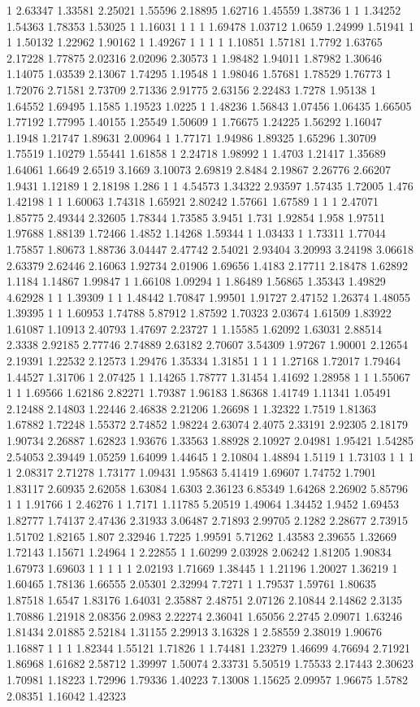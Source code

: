 1 2.63347 1.33581 2.25021 1.55596 2.18895 1.62716 1.45559 1.38736 1 1 1.34252 1.54363 1.78353 1.53025 1 1.16031 1 1 1 1.69478 1.03712 1.0659 1.24999 1.51941 1 1 1.50132 1.22962 1.90162 1 1.49267 1 1 1 1 1.10851 1.57181 1.7792 1.63765 2.17228 1.77875 2.02316 2.02096 2.30573 1 1.98482 1.94011 1.87982 1.30646 1.14075 1.03539 2.13067 1.74295 1.19548 1 1.98046 1.57681 1.78529 1.76773 1 1.72076 2.71581 2.73709 2.71336 2.91775 2.63156 2.22483 1.7278 1.95138 1 1.64552 1.69495 1.1585 1.19523 1.0225 1 1.48236 1.56843 1.07456 1.06435 1.66505 1.77192 1.77995 1.40155 1.25549 1.50609 1 1.76675 1.24225 1.56292 1.16047 1.1948 1.21747 1.89631 2.00964 1 1.77171 1.94986 1.89325 1.65296 1.30709 1.75519 1.10279 1.55441 1.61858 1 2.24718 1.98992 1 1.4703 1.21417 1.35689 1.64061 1.6649 2.6519 3.1669 3.10073 2.69819 2.8484 2.19867 2.26776 2.66207 1.9431 1.12189 1 2.18198 1.286 1 1 4.54573 1.34322 2.93597 1.57435 1.72005 1.476 1.42198 1 1 1.60063 1.74318 1.65921 2.80242 1.57661 1.67589 1 1 1 2.47071 1.85775 2.49344 2.32605 1.78344 1.73585 3.9451 1.731 1.92854 1.958 1.97511 1.97688 1.88139 1.72466 1.4852 1.14268 1.59344 1 1.03433 1 1.73311 1.77044 1.75857 1.80673 1.88736 3.04447 2.47742 2.54021 2.93404 3.20993 3.24198 3.06618 2.63379 2.62446 2.16063 1.92734 2.01906 1.69656 1.4183 2.17711 2.18478 1.62892 1.1184 1.14867 1.99847 1 1.66108 1.09294 1 1.86489 1.56865 1.35343 1.49829 4.62928 1 1 1.39309 1 1 1.48442 1.70847 1.99501 1.91727 2.47152 1.26374 1.48055 1.39395 1 1 1.60953 1.74788 5.87912 1.87592 1.70323 2.03674 1.61509 1.83922 1.61087 1.10913 2.40793 1.47697 2.23727 1 1.15585 1.62092 1.63031 2.88514 2.3338 2.92185 2.77746 2.74889 2.63182 2.70607 3.54309 1.97267 1.90001 2.12654 2.19391 1.22532 2.12573 1.29476 1.35334 1.31851 1 1 1 1.27168 1.72017 1.79464 1.44527 1.31706 1 2.07425 1 1.14265 1.78777 1.31454 1.41692 1.28958 1 1 1.55067 1 1 1.69566 1.62186 2.82271 1.79387 1.96183 1.86368 1.41749 1.11341 1.05491 2.12488 2.14803 1.22446 2.46838 2.21206 1.26698 1 1.32322 1.7519 1.81363 1.67882 1.72248 1.55372 2.74852 1.98224 2.63074 2.4075 2.33191 2.92305 2.18179 1.90734 2.26887 1.62823 1.93676 1.33563 1.88928 2.10927 2.04981 1.95421 1.54285 2.54053 2.39449 1.05259 1.64099 1.44645 1 2.10804 1.48894 1.5119 1 1.73103 1 1 1 1 2.08317 2.71278 1.73177 1.09431 1.95863 5.41419 1.69607 1.74752 1.7901 1.83117 2.60935 2.62058 1.63084 1.6303 2.36123 6.85349 1.64268 2.26902 5.85796 1 1 1.91766 1 2.46276 1 1.7171 1.11785 5.20519 1.49064 1.34452 1.9452 1.69453 1.82777 1.74137 2.47436 2.31933 3.06487 2.71893 2.99705 2.1282 2.28677 2.73915 1.51702 1.82165 1.807 2.32946 1.7225 1.99591 5.71262 1.43583 2.39655 1.32669 1.72143 1.15671 1.24964 1 2.22855 1 1.60299 2.03928 2.06242 1.81205 1.90834 1.67973 1.69603 1 1 1 1 1 2.02193 1.71669 1.38445 1 1.21196 1.20027 1.36219 1 1.60465 1.78136 1.66555 2.05301 2.32994 7.7271 1 1.79537 1.59761 1.80635 1.87518 1.6547 1.83176 1.64031 2.35887 2.48751 2.07126 2.10844 2.14862 2.3135 1.70886 1.21918 2.08356 2.0983 2.22274 2.36041 1.65056 2.2745 2.09071 1.63246 1.81434 2.01885 2.52184 1.31155 2.29913 3.16328 1 2.58559 2.38019 1.90676 1.16887 1 1 1 1.82344 1.55121 1.71826 1 1.74481 1.23279 1.46699 4.76694 2.71921 1.86968 1.61682 2.58712 1.39997 1.50074 2.33731 5.50519 1.75533 2.17443 2.30623 1.70981 1.18223 1.72996 1.79336 1.40223 7.13008 1.15625 2.09957 1.96675 1.5782 2.08351 1.16042 1.42323 